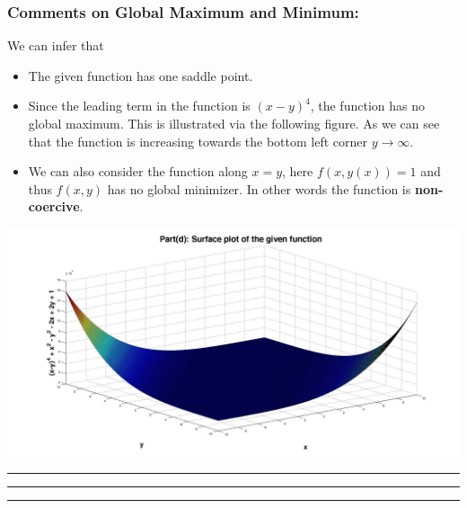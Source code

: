 \subsubsection*{Comments on Global Maximum and Minimum: }
We can infer that
\begin{itemize}
\item The given function has one saddle point. 
\item Since the leading term in the function is $(x-y)^4$, the function has no global maximum. This is illustrated via the following figure. As we can see that the function is increasing towards the bottom left corner $y\rightarrow\infty$. 
\item We can also consider the function along $x=y$, here $f(x,y(x)) = 1$ and thus $f(x,y)$ has no global minimizer. In other words the function is {\bf non-coercive}. 
\end{itemize}
\begin{center}
\includegraphics[width=7.in]{plot4} \\
\end{center}\hrule \hrule \hrule 
